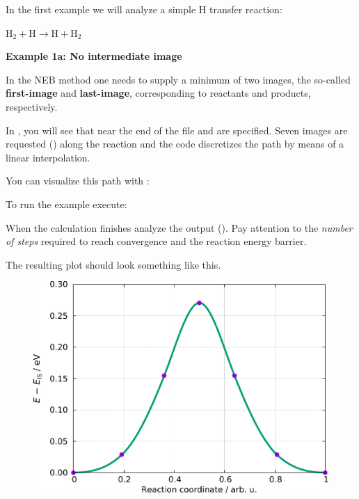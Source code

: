 \documentclass[landscape]{foils}
\begin{document}
In the first example we will analyze a simple H transfer reaction:
\begin{center}
{\large $\mathrm{H_2 + H \rightarrow H + H_2}$}
\end{center}
{\bf Example 1a: No intermediate image}

In the NEB method one needs to supply a minimum of two images, the
so-called {\bf first-image} and {\bf last-image}, corresponding to
reactants and products, respectively.

In , you will see that near the end of the file
 and  are specified. Seven
images are requested () along the
reaction and the  code discretizes the path
by means of a linear interpolation.

You can visualize this path with :


To run the example execute:


When the calculation finishes analyze the output
(). Pay attention to the {\em number of steps} required
to reach convergence and the reaction energy barrier.


The resulting plot should look something like this.
\begin{figure}
  \centering
    \includegraphics[width=14cm]{figs/H2+H-NEB-path.pdf}
\end{figure}
\end{document}
